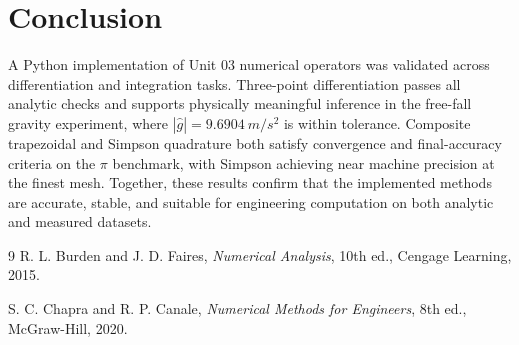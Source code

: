 \documentclass[letterpaper,twocolumn,fleqn]{article}
\begin{document}
\section{Conclusion}
A Python implementation of Unit 03 numerical operators was validated across differentiation and integration tasks. Three-point differentiation passes all analytic checks and supports physically meaningful inference in the free-fall gravity experiment, where $|\hat{g}|=\qty{9.6904}{m/s^2}$ is within tolerance. Composite trapezoidal and Simpson quadrature both satisfy convergence and final-accuracy criteria on the $\pi$ benchmark, with Simpson achieving near machine precision at the finest mesh. Together, these results confirm that the implemented methods are accurate, stable, and suitable for engineering computation on both analytic and measured datasets.

\small
\begin{thebibliography}{9}
R. L. Burden and J. D. Faires, \emph{Numerical Analysis}, 10th ed., Cengage Learning, 2015.

S. C. Chapra and R. P. Canale, \emph{Numerical Methods for Engineers}, 8th ed., McGraw-Hill, 2020.
\end{thebibliography}
\end{document}
